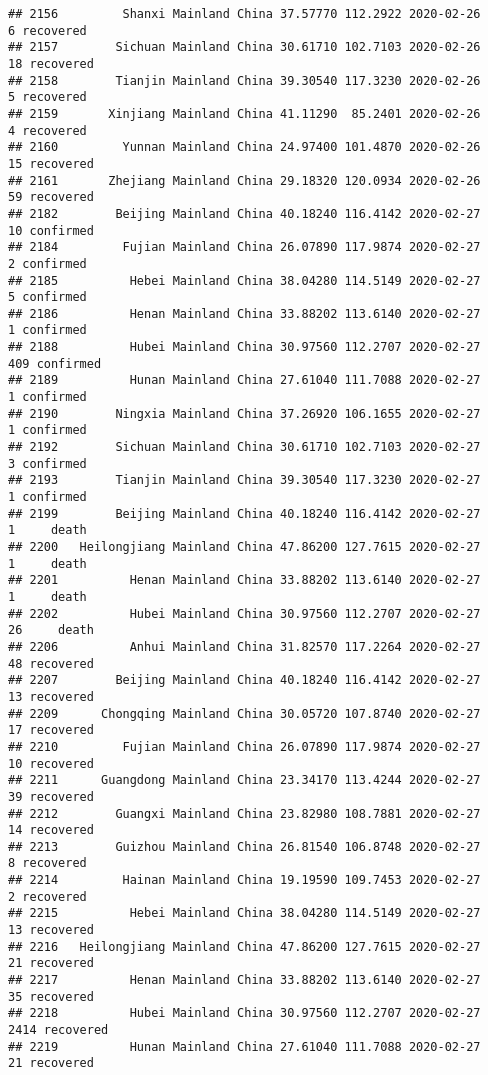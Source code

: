 \documentclass[
]{article}
\begin{document}
\begin{verbatim}
## 2156         Shanxi Mainland China 37.57770 112.2922 2020-02-26     6 recovered
## 2157        Sichuan Mainland China 30.61710 102.7103 2020-02-26    18 recovered
## 2158        Tianjin Mainland China 39.30540 117.3230 2020-02-26     5 recovered
## 2159       Xinjiang Mainland China 41.11290  85.2401 2020-02-26     4 recovered
## 2160         Yunnan Mainland China 24.97400 101.4870 2020-02-26    15 recovered
## 2161       Zhejiang Mainland China 29.18320 120.0934 2020-02-26    59 recovered
## 2182        Beijing Mainland China 40.18240 116.4142 2020-02-27    10 confirmed
## 2184         Fujian Mainland China 26.07890 117.9874 2020-02-27     2 confirmed
## 2185          Hebei Mainland China 38.04280 114.5149 2020-02-27     5 confirmed
## 2186          Henan Mainland China 33.88202 113.6140 2020-02-27     1 confirmed
## 2188          Hubei Mainland China 30.97560 112.2707 2020-02-27   409 confirmed
## 2189          Hunan Mainland China 27.61040 111.7088 2020-02-27     1 confirmed
## 2190        Ningxia Mainland China 37.26920 106.1655 2020-02-27     1 confirmed
## 2192        Sichuan Mainland China 30.61710 102.7103 2020-02-27     3 confirmed
## 2193        Tianjin Mainland China 39.30540 117.3230 2020-02-27     1 confirmed
## 2199        Beijing Mainland China 40.18240 116.4142 2020-02-27     1     death
## 2200   Heilongjiang Mainland China 47.86200 127.7615 2020-02-27     1     death
## 2201          Henan Mainland China 33.88202 113.6140 2020-02-27     1     death
## 2202          Hubei Mainland China 30.97560 112.2707 2020-02-27    26     death
## 2206          Anhui Mainland China 31.82570 117.2264 2020-02-27    48 recovered
## 2207        Beijing Mainland China 40.18240 116.4142 2020-02-27    13 recovered
## 2209      Chongqing Mainland China 30.05720 107.8740 2020-02-27    17 recovered
## 2210         Fujian Mainland China 26.07890 117.9874 2020-02-27    10 recovered
## 2211      Guangdong Mainland China 23.34170 113.4244 2020-02-27    39 recovered
## 2212        Guangxi Mainland China 23.82980 108.7881 2020-02-27    14 recovered
## 2213        Guizhou Mainland China 26.81540 106.8748 2020-02-27     8 recovered
## 2214         Hainan Mainland China 19.19590 109.7453 2020-02-27     2 recovered
## 2215          Hebei Mainland China 38.04280 114.5149 2020-02-27    13 recovered
## 2216   Heilongjiang Mainland China 47.86200 127.7615 2020-02-27    21 recovered
## 2217          Henan Mainland China 33.88202 113.6140 2020-02-27    35 recovered
## 2218          Hubei Mainland China 30.97560 112.2707 2020-02-27  2414 recovered
## 2219          Hunan Mainland China 27.61040 111.7088 2020-02-27    21 recovered

\end{verbatim}
\end{document}
